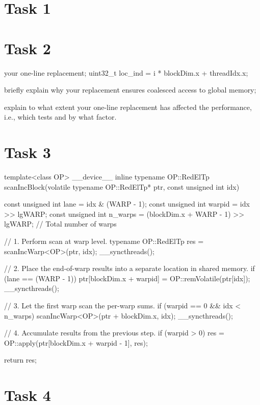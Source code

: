 \documentclass{article}
\begin{document}
\section{Task 1}

\section{Task 2}



your one-line replacement;
uint32_t loc_ind = i * blockDim.x + threadIdx.x;

briefly explain why your replacement ensures coalesced access to global memory;

explain to what extent your one-line replacement has affected the performance, i.e., which tests and by what factor.



\section{Task 3}


template<class OP>
__device__ inline typename OP::RedElTp
scanIncBlock(volatile typename OP::RedElTp* ptr, const unsigned int idx) {
    const unsigned int lane    = idx & (WARP - 1);
    const unsigned int warpid  = idx >> lgWARP;
    const unsigned int n_warps = (blockDim.x + WARP - 1) >> lgWARP; // Total number of warps

    // 1. Perform scan at warp level.
    typename OP::RedElTp res = scanIncWarp<OP>(ptr, idx);
    __syncthreads();

    // 2. Place the end-of-warp results into a separate location in shared memory.
    if (lane == (WARP - 1)) {
        ptr[blockDim.x + warpid] = OP::remVolatile(ptr[idx]);
    }
    __syncthreads();

    // 3. Let the first warp scan the per-warp sums.
    if (warpid == 0 && idx < n_warps) {
        scanIncWarp<OP>(ptr + blockDim.x, idx);
    }
    __syncthreads();

    // 4. Accumulate results from the previous step.
    if (warpid > 0) {
        res = OP::apply(ptr[blockDim.x + warpid - 1], res);
    }

    return res;
}

\section{Task 4}
\end{document}
